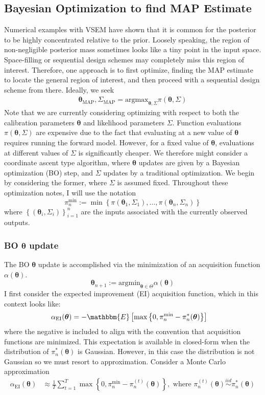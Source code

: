 \documentclass[12pt]{article}
\newcommand{\btheta}{\boldsymbol{\theta}}
\begin{document}
\subsection{Bayesian Optimization to find MAP Estimate}
Numerical examples with VSEM have shown that it is common for the posterior to be highly concentrated relative to the prior. Loosely speaking, the region of 
non-negligible posterior mass sometimes looks like a tiny point in the input space. Space-filling or sequential design schemes may completely miss this region 
of interest. Therefore, one approach is to first optimize, finding the MAP estimate to locate the general region of interest, and then proceed with a sequential 
design scheme from there. Ideally, we seek 
\begin{align*}
\btheta_{\text{MAP}}, \Sigma_{\text{MAP}} = \text{argmax}_{\btheta, \Sigma} \pi(\btheta, \Sigma)
\end{align*}
Note that we are currently considering optimizing with respect to both the calibration parameters $\btheta$ and likelihood parameters $\Sigma$. 
Function evaluations $\pi(\btheta, \Sigma)$ are expensive due to the fact that evaluating at a new value of $\btheta$ requires running the forward 
model. However, for a fixed value of $\btheta$, evaluations at different values of $\Sigma$ is significantly cheaper. We therefore might consider 
a coordinate ascent type algorithm, where $\btheta$ updates are given by a Bayesian optimization (BO) step, and $\Sigma$ updates by a traditional 
optimization. We begin by considering the former, where $\Sigma$ is assumed fixed. Throughout these optimization notes, I will use the notation 
\[\pi_n^{\min} := \min\left\{\pi(\btheta_1, \Sigma_1), \dots, \pi(\btheta_n, \Sigma_n) \right\}\]
where $\left\{(\btheta_i, \Sigma_i) \right\}_{i = 1}^{n}$ are the inputs associated with the currently observed outputs. 

\subsubsection{BO $\btheta$ update}
The BO $\btheta$ update is accomplished via the minimization of an acquisition function $\alpha(\btheta)$. 
\[\btheta_{n+1} := \text{argmin}_{\btheta \in \Theta} \alpha(\btheta) \]
I first consider the expected improvement (EI) acquisition function, which in 
this context looks like: 
\begin{align*}
\alpha_{\text{EI}}(\btheta) &= -\mathbbm{E}\left[\max\left\{0, \pi_n^{\min} - \pi_n^*(\btheta) \right\} \right]
\end{align*}
where the negative is included to align with the convention that acquisition functions are minimized. 
This expectation is available in closed-form when the distribution of $\pi_n^*(\btheta)$ is Gaussian. However, in this case the distribution is not Gaussian so 
we must resort to approximation. Consider a Monte Carlo approximation 
\begin{align*}
\alpha_{\text{EI}}(\btheta) &\approx \frac{1}{T} \sum_{t = 1}^{T} \max\left\{0, \pi_n^{\min} - \pi^{(t)}_n(\btheta) \right\}, \text{ where } \pi^{(t)}_n(\btheta) \overset{iid}{\sim} \pi_n^*(\btheta)
\end{align*}
\end{document}
